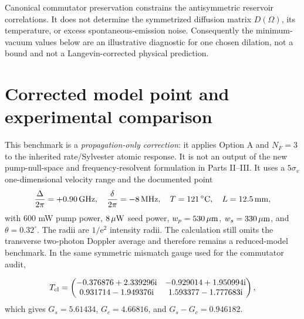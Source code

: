 \documentclass[11pt,a4paper]{article}
\newcommand{\ii}{\mathrm i}
\newcommand{\e}{\mathrm e}
\newcommand{\GHz}{\,\mathrm{GHz}}
\newcommand{\MHz}{\,\mathrm{MHz}}
\newcommand{\degC}{\,^{\circ}\mathrm C}
\begin{document}
Canonical commutator preservation constrains the antisymmetric reservoir
correlations. It does not determine the symmetrized diffusion matrix
$D(\Omega)$, its temperature, or excess spontaneous-emission noise.
Consequently the minimum-vacuum values below are an illustrative diagnostic
for one chosen dilation, not a bound and not a Langevin-corrected physical
prediction.

\clearpage
\section{Corrected model point and experimental comparison}

This benchmark is a \emph{propagation-only correction}: it applies Option A
and $N_F=3$ to the inherited rate/Sylvester atomic response. It is not an
output of the new pump-null-space and frequency-resolvent formulation in
Parts II--III. It uses a $5\sigma_v$ one-dimensional velocity range and the
documented point
\[
\frac{\Delta}{2\pi}=+0.90\GHz,\quad
\frac{\delta}{2\pi}=-8\MHz,\quad T=121\degC,\quad L=12.5\,{\rm mm},
\]
with 600 mW pump power, $8\,\mu{\rm W}$ seed power,
$w_p=530\,\mu{\rm m}$, $w_s=330\,\mu{\rm m}$, and
$\theta=0.32^\circ$. The radii are $1/\e^2$ intensity radii.
The calculation still omits the transverse two-photon Doppler average and
therefore remains a reduced-model benchmark. In the same symmetric mismatch
gauge used for the commutator audit,

\[
T_{\rm cl}=
\begin{pmatrix}
-0.376876+2.339296\ii&-0.929014+1.950994\ii\\
 0.931714-1.949376\ii&1.593377-1.777683\ii
\end{pmatrix},
\]
which gives $G_s=5.61434$, $G_c=4.66816$, and
$G_s-G_c=0.946182$.
\end{document}
